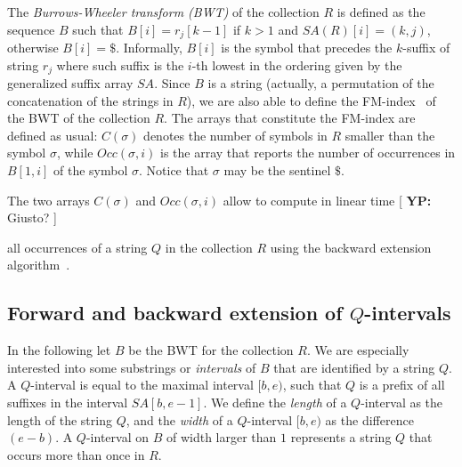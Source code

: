 \documentclass[runningheads,envcountsame,a4paper]{llncs}
\newcommand{\notaestesa}[2]{%
 \marginpar{\color{red!75!black}\textbf{\texttimes}}%
 {\color{red!75!black}%
 [\,\textbullet\,\textsf{\textbf{#1:}} %
 \textsf{\footnotesize#2}\,\textbullet\,]}%
}
\newcommand{\YP}[1]{\notaestesa{YP}{#1}}
\newcommand{\SA}{\ensuremath{\textit{SA}}}
\newcommand{\Occ}{\ensuremath{\textit{Occ}}}
\begin{document}
The \emph{Burrows-Wheeler transform (BWT)} of the collection $R$ is
defined as the sequence $B$ such that $B[i]=r_{j}[k -1]$ if $k > 1$
and $\SA(R)[i] = (k,j)$, otherwise $B[i]= \$$.
Informally, $B[i]$ is the symbol that precedes the $k$-suffix of
string $r_j$ where such suffix is the $i$-th lowest in the ordering
given by the generalized suffix array $\SA$.
Since $B$ is a string (actually, a permutation of the concatenation of
the strings in $R$), we are also able to define the
FM-index~\cite{Ferragina2005} of the BWT of the collection $R$.
The arrays that constitute the FM-index are defined as usual: $C(\sigma)$ denotes the number of symbols in $R$ smaller than the symbol
$\sigma$, while $\Occ(\sigma, i)$ is the array that reports the number
of occurrences in $B[1, i]$ of the symbol $\sigma$.
Notice that $\sigma$ may be the sentinel $\$$.


The two arrays $C(\sigma)$ and $Occ(\sigma, i)$
allow to compute in linear time
\YP{Giusto?}
all occurrences of a string $Q$ in the collection $R$
using the backward extension algorithm~\cite{Ferragina2005}.







\subsection{Forward and backward extension of $Q$-intervals}

In the following let $B$ be the BWT for the collection $R$.
We are especially interested into some substrings or \emph{intervals} of $B$ that are identified by a string $Q$.
A $Q$-interval is equal to the maximal interval $[b, e)$, such that
$Q$ is a prefix of all suffixes in the interval $SA[b, e-1]$.
We define the \emph{length} of a $Q$-interval as the length of
the string $Q$, and the \emph{width} of a $Q$-interval $[b, e)$ as the
difference $(e-b)$.
A $Q$-interval on $B$ of width larger than $1$ represents a string $Q$
that occurs more than once in $R$.
\end{document}
